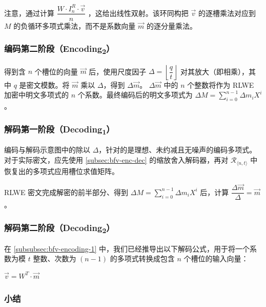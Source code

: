 注意，通过计算 $\dfrac{W \cdot I_n^R \cdot \vec{v}}{n}$
，这给出线性双射。该环同构把 $\vec v$ 的逐槽乘法对应到 $M$ 的负循环多项式乘法，而不是系数向量 $\vec m$ 的逐分量乘法。

\subsubsection{编码第二阶段（\textsf{Encoding\textsubscript{2}}）}

得到含 $n$ 个槽位的向量 $\vec{m}$ 后，使用尺度因子 $\Delta = \left\lfloor \dfrac{q}{t} \right\rfloor$ 对其放大（即相乘），其中 $q$ 是密文模数。将 $\vec{m}$ 乘以 $\Delta$，得到 $\Delta \vec{m}$。
$\Delta\vec{m}$ 中的 $n$ 个整数将作为 RLWE 加密中明文多项式的 $n$ 个系数。最终编码后的明文多项式为 $\Delta M = \sum\limits_{i=0}^{n-1}\Delta m_iX^i$。


\subsubsection{解码第一阶段（\textsf{Decoding\textsubscript{1}}）}
\label{subsubsec:bfv-enc-dec-decoding1} 

编码与解码示意图中的除以 $\Delta$，针对的是理想、未约减且无噪声的编码多项式。对于实际密文，应先使用 \autoref{subsec:bfv-enc-dec} 的缩放舍入解码器，再对 $\mathcal R_{\langle n,t\rangle}$ 中恢复出的多项式应用槽位求值矩阵。

RLWE 密文完成解密的前半部分、得到 $\Delta M = \sum\limits_{i=0}^{n-1}\Delta m_iX^i$ 后，计算 $\dfrac{\Delta\vec{m}}{\Delta} = \vec{m}$。




\subsubsection{解码第二阶段（\textsf{Decoding\textsubscript{2}}）}


在 \autoref{subsubsec:bfv-encoding-1} 中，我们已经推导出以下解码公式，用于将一个系数为模 $t$ 整数、次数为 $(n-1)$ 的多项式转换成包含 $n$ 个槽位的输入向量：

$\vec{v} = W^T \cdot \vec{m}$


\subsubsection{小结}
\label{subsubsec:bfv-encoding-summary}

